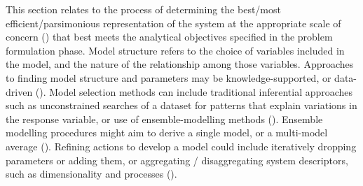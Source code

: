 \documentclass[
]{article}
\begin{document}
\begin{tcolorbox}[enhanced jigsaw, opacitybacktitle=0.6, bottomrule=.15mm, leftrule=.75mm, rightrule=.15mm, colbacktitle=quarto-callout-note-color!10!white, toprule=.15mm, titlerule=0mm, left=2mm, colframe=quarto-callout-note-color-frame, breakable, title=\textcolor{quarto-callout-note-color}{\faInfo}\hspace{0.5em}{Explanation}, opacityback=0, coltitle=black, bottomtitle=1mm, colback=white, toptitle=1mm, arc=.35mm]

This section relates to the process of determining the best/most
efficient/parsimonious representation of the system at the appropriate
scale of concern ()
that best meets the analytical objectives specified in the problem
formulation phase. Model structure refers to the choice of variables
included in the model, and the nature of the relationship among those
variables. Approaches to finding model structure and parameters may be
knowledge-supported, or data-driven (). Model selection methods can include traditional
inferential approaches such as unconstrained searches of a dataset for
patterns that explain variations in the response variable, or use of
ensemble-modelling methods (). Ensemble modelling procedures might aim to derive a single
model, or a multi-model average (). Refining actions to develop a model could include iteratively
dropping parameters or adding them, or aggregating / disaggregating
system descriptors, such as dimensionality and processes
().

\end{tcolorbox}
\end{document}
